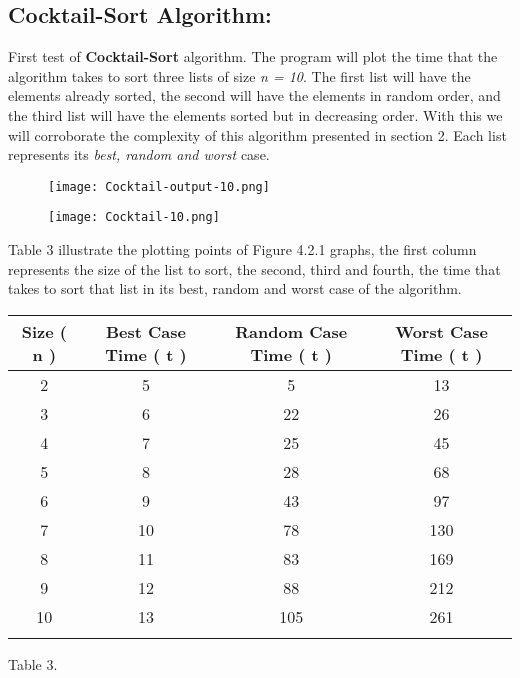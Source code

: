 \subsection{Cocktail-Sort Algorithm:}

First test of {\bfseries Cocktail-Sort} algorithm. The program will plot the time that the algorithm takes to sort three lists of size {\itshape n = 10}. The first list will have the elements already sorted, the second will have the elements in random order, and the third list will have the elements sorted but in decreasing order. With this we will corroborate the complexity of this algorithm presented in section 2. Each list represents its {\itshape best, random and worst} case. \hfill \break

\begin{figure}[H]
\texttt{[image: Cocktail-output-10.png]}
\centering \linebreak {}
\end{figure}

\begin{figure}[H]
\texttt{[image: Cocktail-10.png]}
\centering \linebreak {}
\end{figure} \pagebreak

Table 3 illustrate the plotting points of Figure 4.2.1 graphs, the first column represents the size of the list to sort, the second, third and fourth, the time that takes to sort that list in its best, random and worst case of the algorithm. \hfill \break

{\small
\begin{center} 
\begin{tabular}[.5cm]{ c c c c } 
\toprule \toprule
\hspace {5px} Size ( n ) \hspace {5px} & \hspace {15px} Best Case Time ( t ) \hspace {15px} & \hspace {15px} Random Case Time ( t ) \hspace {15px} & \hspace {15px} Worst Case Time ( t ) \hspace {15px} \\ 
\midrule \midrule
2 & 5 & 5 & 13 \\ 
\cmidrule {1-4} 
3 & 6 & 22 & 26 \\ 
\cmidrule {1-4} 
4 & 7 & 25 & 45 \\ 
\cmidrule {1-4} 
5 & 8 & 28 & 68 \\ 
\cmidrule {1-4} 
6 & 9 & 43 & 97 \\ 
\cmidrule {1-4} 
7 & 10 & 78 & 130 \\ 
\cmidrule {1-4} 
8 & 11 & 83 & 169 \\ 
\cmidrule {1-4} 
9 & 12 & 88 & 212 \\ 
\cmidrule {1-4} 
10 & 13 & 105 & 261 \\ 
\bottomrule 
\linebreak 
\end{tabular} 
\linebreak \linebreak Table 3.
\end{center}}

